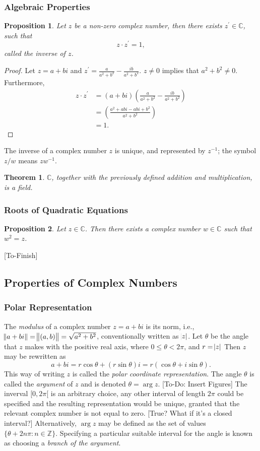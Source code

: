 \documentclass[12pt]{article}
\newcommand{\CC}{\mathbb{C}}
\newcommand{\ZZ}{\mathbb{Z}}
\newtheorem{theorem}{Theorem}[section]
\newtheorem{prop}{Proposition}[theorem]
\theoremstyle{definition}
\begin{document}
\subsubsection{Algebraic Properties}
\begin{prop}
	Let $z$ be a non-zero complex number, then there exists $z^\prime \in \CC$, such that
	\[ z\cdot z^\prime = 1 , \]
	called the inverse of $z$.
\end{prop}
\begin{proof}
	Let $z = a+bi$ and $z^\prime = \frac{a}{a^2 + b^2} - \frac{ib}{a^2+b^2}$. $z \neq 0$ implies that $a^2 + b^2 \neq 0$. Furthermore,
	\begin{align*}
		z \cdot z^\prime &= (a+bi) \left (\frac{a}{a^2 + b^2} - \frac{ib}{a^2+b^2} \right) \\
		&= \left ( \frac{a^2 + abi - abi + b^2}{a^2+b^2} \right ) \\
		&= 1.
	\end{align*}
\end{proof}
The inverse of a complex number $z$ is unique, and represented by $z^{-1}$; the symbol $z/w$ means $zw^{-1}$.
\begin{theorem}
	$\CC$, together with the previously defined addition and multiplication, is a field.	
\end{theorem}
\subsubsection{Roots of Quadratic Equations}
\begin{prop}
Let $z \in \CC$. Then there exists a complex number $w \in \CC$ such that $w^2 = z$.	
\end{prop}
[To-Finish]
\subsection{Properties of Complex Numbers}
\subsubsection{Polar Representation}
The \emph{modulus} of a complex number $z=a+bi$ is its norm, i.e., $\norm{a+bi} = \norm{(a,b)} = \sqrt{a^2 + b^2}$, conventionally written as $\abs{z}$. Let $\theta$ be the angle that $z$ makes with the positive real axis, where $0 \leq \theta < 2\pi$, and $r = \abs{z}$ Then $z$ may be rewritten as
\[ 
	a+bi = r \cos \theta + (r \sin \theta) i = r(\cos \theta + i \sin \theta).
\]
This way of writing $z$ is called the \emph{polar coordinate representation}. The angle $\theta$ is called the \emph{argument} of $z$ and is denoted $\theta = \arg z$.
[To-Do: Insert Figures]
The inverval $[0, 2 \pi[$ is an arbitrary choice, any other interval of length $2\pi$ could be specified and the resulting representation would be unique, granted that the relevant complex number is not equal to zero. [True? What if it's a closed interval?] Alternatively, $\arg z$ may be defined as the set of values $\{ \theta + 2n \pi : n \in \ZZ \}$. Specifying a particular suitable interval for the angle is known as choosing a \emph{branch of the argument}.
\end{document}
